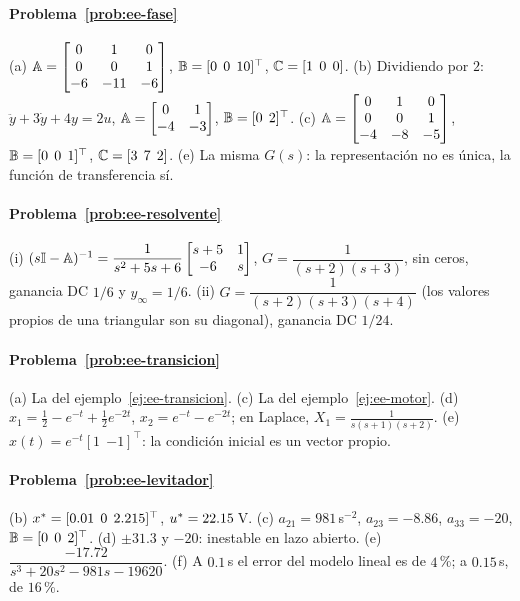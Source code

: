 \paragraph{Problema~\ref{prob:ee-fase}}
(a) $\mathbb{A}=\begin{bmatrix}0&1&0\\0&0&1\\-6&-11&-6\end{bmatrix}$, $\mathbb{B}=[0\;\,0\;\,10]^\top$, $\mathbb{C}=[1\;\,0\;\,0]$. (b) Dividiendo por $2$: $\ddot y+3\dot y+4y=2u$, $\mathbb{A}=\begin{bmatrix}0&1\\-4&-3\end{bmatrix}$, $\mathbb{B}=[0\;\,2]^\top$. (c) $\mathbb{A}=\begin{bmatrix}0&1&0\\0&0&1\\-4&-8&-5\end{bmatrix}$, $\mathbb{B}=[0\;\,0\;\,1]^\top$, $\mathbb{C}=[3\;\,7\;\,2]$. (e) La misma $G(s)$: la representación no es única, la función de transferencia sí.

\paragraph{Problema~\ref{prob:ee-resolvente}}
(i) $(s\mathbb{I}-\mathbb{A})^{-1}=\dfrac{1}{s^2+5s+6}\begin{bmatrix}s+5&1\\-6&s\end{bmatrix}$, $G=\dfrac{1}{(s+2)(s+3)}$, sin ceros, ganancia DC $1/6$ y $y_\infty=1/6$. (ii) $G=\dfrac{1}{(s+2)(s+3)(s+4)}$ (los valores propios de una triangular son su diagonal), ganancia DC $1/24$.

\paragraph{Problema~\ref{prob:ee-transicion}}
(a) La del ejemplo~\ref{ej:ee-transicion}. (c) La del ejemplo~\ref{ej:ee-motor}. (d) $x_1=\frac12-e^{-t}+\frac12e^{-2t}$, $x_2=e^{-t}-e^{-2t}$; en Laplace, $X_1=\frac{1}{s(s+1)(s+2)}$. (e) $x(t)=e^{-t}[1\;\,{-1}]^\top$: la condición inicial es un vector propio.

\paragraph{Problema~\ref{prob:ee-levitador}}
(b) $x^{*}=[0.01\;\,0\;\,2.215]^\top$, $u^{*}=22.15$\,V. (c) $a_{21}=981$\,s$^{-2}$, $a_{23}=-8.86$, $a_{33}=-20$, $\mathbb{B}=[0\;\,0\;\,2]^\top$. (d) $\pm31.3$ y $-20$: inestable en lazo abierto. (e) $\dfrac{-17.72}{s^3+20s^2-981s-19620}$. (f) A $0.1$\,s el error del modelo lineal es de $4$\,\%; a $0.15$\,s, de $16$\,\%.

